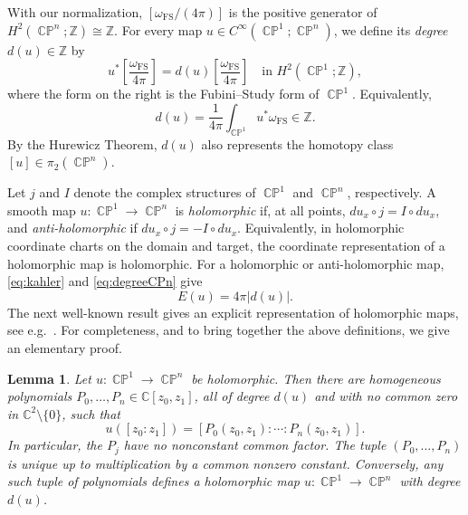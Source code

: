 \documentclass[11pt]{article}
\theoremstyle{plain}
\numberwithin{equation}{section}
\newtheorem{lemma}[theorem]{Lemma}
\theoremstyle{definition}
\def \Z {\mathbb{Z}}
\def \C{\mathbb{C}}
\def \FS{\mathrm{FS}}
\DeclareMathOperator{\CP}{\mathbb{CP}}
\begin{document}
With our normalization, $[\omega_\FS/(4\pi)]$ is the positive generator of
$H^2(\CP^n;\Z)\cong \Z$.  For every map $u\in C^\infty(\CP^1;\CP^n)$, we define its
\emph{degree} $d(u)\in\Z$ by
\[
    u^*\left[\frac{\omega_\FS}{4\pi}\right]
    =d(u)\left[\frac{\omega_\FS}{4\pi}\right]
    \quad\text{in }H^2(\CP^1;\Z),
\]
where the form on the right is the Fubini--Study form of $\CP^1$.
Equivalently,
\begin{equation}
    \label{eq:degreeCPn}
    d(u)=\frac{1}{4\pi}\int_{\CP^1}u^*\omega_\FS\in\Z.
\end{equation}
By the Hurewicz Theorem,  $d(u)$ also
represents the homotopy class $[u]\in\pi_2(\CP^n)$.

Let $j$ and $I$ denote the complex structures of $\CP^1$ and $\CP^n$,
respectively.  A smooth map $u\colon\CP^1\to\CP^n$ is \emph{holomorphic} if, at all points,
$    du_x\circ j=I\circ du_x$, and \emph{anti-holomorphic} if $du_x\circ j=-I\circ du_x$.
Equivalently, in holomorphic coordinate charts on the domain and target, the
coordinate representation of a holomorphic map is holomorphic.  For a
holomorphic or anti-holomorphic map, 
\eqref{eq:kahler} and \eqref{eq:degreeCPn} give
\begin{equation}
    \label{eq:energyDegreeHolomorphic}
    E(u)=4\pi|d(u)|.
\end{equation}
The next well-known result gives an explicit representation of holomorphic maps, see e.g.\ \cite{Huybrechts2005}. For completeness, and to bring together the above definitions, we give an elementary proof.

\begin{lemma}
    \label{lem:holomorphicHomogeneousRepresentation}
Let $u\colon\CP^1\to\CP^n$ be holomorphic.  Then there are homogeneous
polynomials $P_0,\ldots,P_n\in\C[z_0,z_1]$, all of degree $d(u)$ and with no
common zero in $\C^2\setminus\{0\}$, such that
\begin{equation}
    \label{eq:holomorphicHomogeneousRepresentation}
    u([z_0:z_1])=[P_0(z_0,z_1):\cdots:P_n(z_0,z_1)].
\end{equation}
In particular, the $P_j$ have no nonconstant common factor.  The tuple
$(P_0,\ldots,P_n)$ is unique up to multiplication by a common nonzero
constant.  Conversely, any such tuple of polynomials defines a holomorphic map $u\colon\CP^1\to\CP^n$ with degree $d(u)$.
\end{lemma}
\end{document}
